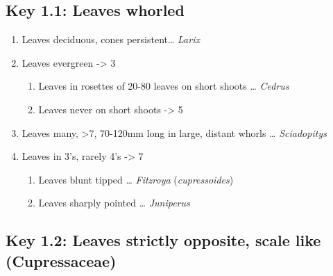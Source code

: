 \documentclass[openany]{book}
\providecommand{\tightlist}{%
  \setlength{\itemsep}{0pt}\setlength{\parskip}{0pt}}
\begin{document}
\hypertarget{key-1.1-leaves-whorled}{%
\subsection*{Key 1.1: Leaves whorled}\label{key-1.1-leaves-whorled}}

\begin{enumerate}
\def\labelenumi{\arabic{enumi}.}
\tightlist
\item
  Leaves deciduous, cones persistent\ldots{} \emph{Larix}
\item
  Leaves evergreen -\textgreater{} 3

  \begin{enumerate}
  \def\labelenumii{\arabic{enumii}.}
  \setcounter{enumii}{2}
  \tightlist
  \item
    Leaves in rosettes of 20-80 leaves on short shoots \ldots{}
    \emph{Cedrus}
  \item
    Leaves never on short shoots -\textgreater{} 5
  \end{enumerate}
\item
  Leaves many, \textgreater{}7, 70-120mm long in large, distant whorls
  \ldots{} \emph{Sciadopitys}
\item
  Leaves in 3's, rarely 4's -\textgreater{} 7

  \begin{enumerate}
  \def\labelenumii{\arabic{enumii}.}
  \setcounter{enumii}{6}
  \tightlist
  \item
    Leaves blunt tipped \ldots{} \emph{Fitzroya} (\emph{cupressoides})
  \item
    Leaves sharply pointed \ldots{} \emph{Juniperus}
  \end{enumerate}
\end{enumerate}

\hypertarget{key-1.2-leaves-strictly-opposite-scale-like-cupressaceae}{%
\subsection*{Key 1.2: Leaves strictly opposite, scale like
(Cupressaceae)}\label{key-1.2-leaves-strictly-opposite-scale-like-cupressaceae}}
\end{document}
